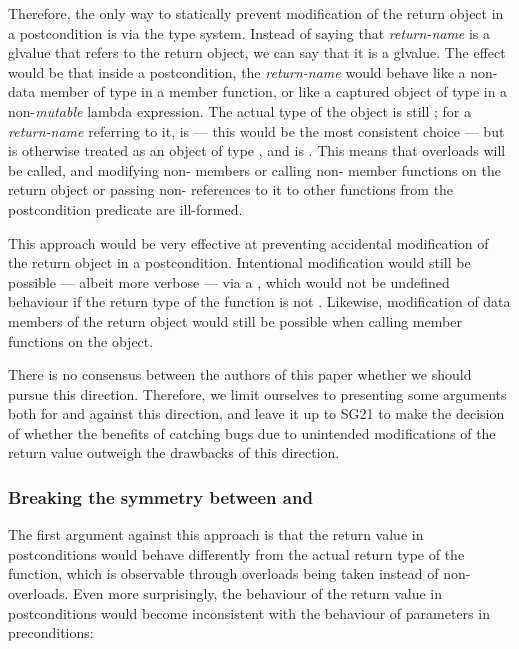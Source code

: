 Therefore, the only way to statically prevent modification of the return object in a postcondition is via the type system. Instead of saying that \emph{return-name} is a glvalue that refers to the return object, we can say that it is a  glvalue. The effect would be that inside a postcondition, the \emph{return-name} would behave like a non- data member of type  in a  member function, or like a captured object of type  in a non-\emph{mutable} lambda expression. The actual type of the object is still ; for a \emph{return-name}  referring to it,  is  --- this would be the most consistent choice --- but  is otherwise treated as an object of type , and  is . This means that  overloads will be called, and modifying non- members or calling non- member functions on the return object or passing non- references to it to other functions from the postcondition predicate are ill-formed.

This approach would be very effective at preventing accidental modification of the return object in a postcondition. Intentional modification would still be possible --- albeit more verbose --- via a , which would not be undefined behaviour if the return type of the function is not . Likewise, modification of  data members of the return object would still be possible when calling  member functions on the object.

There is no consensus between the authors of this paper whether we should pursue this direction. Therefore, we limit ourselves to presenting some arguments both for and against this direction, and leave it up to SG21 to make the decision of whether the benefits of catching bugs due to unintended modifications of the return value outweigh the drawbacks of this direction.

\subsubsection{Breaking the symmetry between  and }

The first argument against this approach is that the return value in postconditions would behave differently from the actual return type of the function, which is observable through  overloads being taken instead of non- overloads. Even more surprisingly, the behaviour of the return value in postconditions would become inconsistent with the behaviour of parameters in preconditions:

